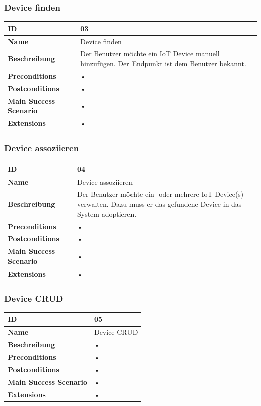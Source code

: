 \subsubsection{Device finden}
\mbox{}
\begin{longtable}{| p{4cm} | p{11.7cm} |}
 \hline
 \textbf{ID} & 03\\ \hline 
 \textbf{Name} & Device finden\\ \hline 
 \textbf{Beschreibung} & Der Benutzer möchte ein IoT Device manuell hinzufügen. Der Endpunkt ist dem Benutzer bekannt. \\ \hline 
 \textbf{Preconditions} & • \\ \hline 
 \textbf{Postconditions} & • \\ \hline 
 \textbf{Main Success Scenario} & • \\ \hline 
 \textbf{Extensions} & • \\ \hline 
 \end{longtable}
 
\subsubsection{Device assoziieren}
\mbox{}
\begin{longtable}{| p{4cm} | p{11.7cm} |}
 \hline
 \textbf{ID} & 04\\ \hline 
 \textbf{Name} & Device assoziieren \\ \hline 
 \textbf{Beschreibung} & Der Benutzer möchte ein- oder mehrere IoT Device(s) verwalten. Dazu muss er das gefundene Device in das System adoptieren. \\ \hline 
 \textbf{Preconditions} & • \\ \hline 
 \textbf{Postconditions} & • \\ \hline 
 \textbf{Main Success Scenario} & • \\ \hline 
 \textbf{Extensions} & • \\ \hline 
 \end{longtable}
 
\subsubsection{Device CRUD}
\mbox{}
\begin{longtable}{| p{4cm} | p{11.7cm} |}
 \hline
 \textbf{ID} & 05\\ \hline 
 \textbf{Name} & Device CRUD\\ \hline 
 \textbf{Beschreibung} & • \\ \hline 
 \textbf{Preconditions} & • \\ \hline 
 \textbf{Postconditions} & • \\ \hline 
 \textbf{Main Success Scenario} & • \\ \hline 
 \textbf{Extensions} & • \\ \hline 
 \end{longtable}
 

